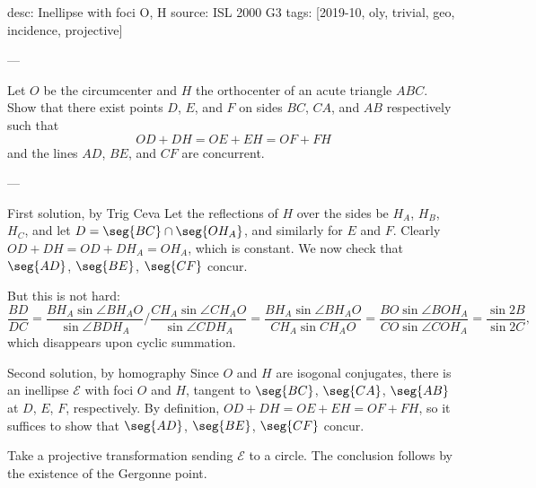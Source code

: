 desc: Inellipse with foci O, H
source: ISL 2000 G3
tags: [2019-10, oly, trivial, geo, incidence, projective]

---

Let $O$ be the circumcenter and $H$ the orthocenter of an acute triangle $ABC$. Show that there exist points $D$, $E$, and $F$ on sides $BC$, $CA$, and $AB$ respectively such that\[OD+DH=OE+EH=OF+FH\]
and the lines $AD$, $BE$, and $CF$ are concurrent.

---

\begin{customenv}{First solution, by Trig Ceva}
    Let the reflections of $H$ over the sides be $H_A$, $H_B$, $H_C$, and let $D=\seg{BC}\cap\seg{OH_A}$, and similarly for $E$ and $F$. Clearly $OD+DH=OD+DH_A=OH_A$, which is constant. We now check that $\seg{AD}$, $\seg{BE}$, $\seg{CF}$ concur.

    But this is not hard: \[\frac{BD}{DC}=\frac{BH_A\sin\angle BH_AO}{\sin\angle BDH_A}\bigg/\frac{CH_A\sin\angle CH_AO}{\sin\angle CDH_A}=\frac{BH_A\sin\angle BH_AO}{CH_A\sin CH_AO}=\frac{BO\sin\angle BOH_A}{CO\sin\angle COH_A}=\frac{\sin 2B}{\sin 2C},\]
    which disappears upon cyclic summation.
\end{customenv}
\begin{customenv}{Second solution, by homography}
    Since $O$ and $H$ are isogonal conjugates, there is an inellipse $\mathcal E$ with foci $O$ and $H$, tangent to $\seg{BC}$, $\seg{CA}$, $\seg{AB}$ at $D$, $E$, $F$, respectively. By definition, $OD+DH=OE+EH=OF+FH$, so it suffices to show that $\seg{AD}$, $\seg{BE}$, $\seg{CF}$ concur.

    Take a projective transformation sending $\mathcal E$ to a circle. The conclusion follows by the existence of the Gergonne point.
\end{customenv}
